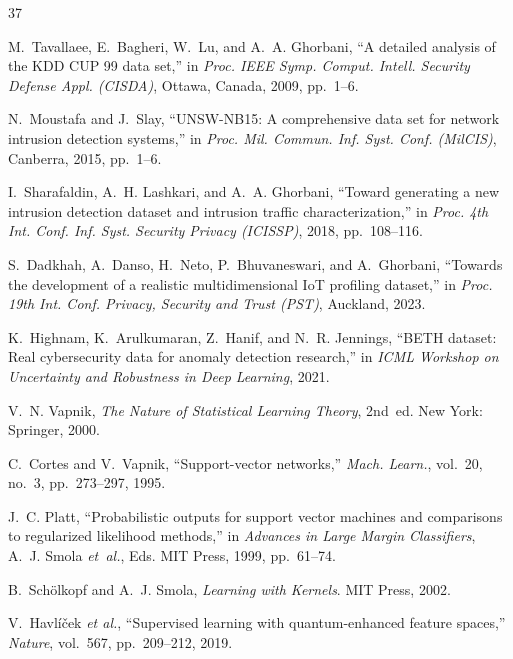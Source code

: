 \documentclass[journal]{IEEEtran}
\begin{document}
  \begin{thebibliography}{37}

  M.~Tavallaee, E.~Bagheri, W.~Lu, and A.~A. Ghorbani,
  ``A detailed analysis of the KDD CUP 99 data set,'' in
  \emph{Proc. IEEE Symp. Comput. Intell. Security Defense Appl. (CISDA)},
  Ottawa, Canada, 2009, pp.~1--6.

  N.~Moustafa and J.~Slay,
  ``UNSW-NB15: A comprehensive data set for network intrusion
    detection systems,'' in \emph{Proc. Mil. Commun. Inf. Syst. Conf.
    (MilCIS)}, Canberra, 2015, pp.~1--6.

  I.~Sharafaldin, A.~H. Lashkari, and A.~A. Ghorbani,
  ``Toward generating a new intrusion detection dataset and intrusion
    traffic characterization,'' in \emph{Proc. 4th Int. Conf. Inf. Syst.
    Security Privacy (ICISSP)}, 2018, pp.~108--116.

  S.~Dadkhah, A.~Danso, H.~Neto, P.~Bhuvaneswari, and A.~Ghorbani,
  ``Towards the development of a realistic multidimensional IoT
    profiling dataset,'' in \emph{Proc. 19th Int. Conf. Privacy,
    Security and Trust (PST)}, Auckland, 2023.

  K.~Highnam, K.~Arulkumaran, Z.~Hanif, and N.~R. Jennings,
  ``BETH dataset: Real cybersecurity data for anomaly detection
    research,'' in \emph{ICML Workshop on Uncertainty and Robustness
    in Deep Learning}, 2021.

  V.~N. Vapnik, \emph{The Nature of Statistical Learning Theory},
  2nd~ed. New York: Springer, 2000.

  C.~Cortes and V.~Vapnik, ``Support-vector networks,''
  \emph{Mach. Learn.}, vol.~20, no.~3, pp.~273--297, 1995.

  J.~C. Platt, ``Probabilistic outputs for support vector machines
    and comparisons to regularized likelihood methods,'' in
  \emph{Advances in Large Margin Classifiers},
  A.~J. Smola \emph{et~al.}, Eds. MIT Press, 1999, pp.~61--74.

  B.~Sch\"{o}lkopf and A.~J. Smola, \emph{Learning with Kernels}.
  MIT Press, 2002.

  V.~Havl\'i\v{c}ek \emph{et al.},
  ``Supervised learning with quantum-enhanced feature spaces,''
  \emph{Nature}, vol.~567, pp.~209--212, 2019.


\end{thebibliography}
\end{document}
